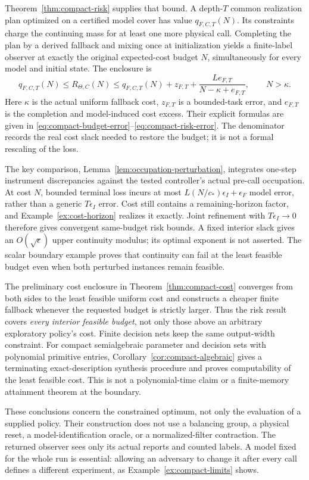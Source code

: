 Theorem~\ref{thm:compact-risk} supplies that bound. A depth-$T$ common realization plan optimized on a certified model cover has value $q_{F,C,T}(N)$. Its constraints charge the continuing mass for at least one more physical call. Completing the plan by a derived fallback and mixing once at initialization yields a finite-label observer at exactly the original expected-cost budget $N$, simultaneously for every model and initial state. The enclosure is
\[
 q_{F,C,T}(N)\le R_{\Theta,C}(N)
 \le q_{F,C,T}(N)+z_{F,T}
       +\frac{Le_{F,T}}{N-\kappa+e_{F,T}},
 \qquad N>\kappa.
\]
Here $\kappa$ is the actual uniform fallback cost, $z_{F,T}$ is a bounded-task error, and $e_{F,T}$ is the completion and model-induced cost excess. Their explicit formulas are given in \eqref{eq:compact-budget-error}--\eqref{eq:compact-risk-error}. The denominator records the real cost slack needed to restore the budget; it is not a formal rescaling of the loss.

The key comparison, Lemma~\ref{lem:occupation-perturbation}, integrates one-step instrument discrepancies against the tested controller's actual pre-call occupation. At cost $N$, bounded terminal loss incurs at most $L(N/c_*)\epsilon_I+\epsilon_F$ model error, rather than a generic $T\epsilon_I$ error. Cost still contains a remaining-horizon factor, and Example~\ref{ex:cost-horizon} realizes it exactly. Joint refinement with $T\epsilon_I\to0$ therefore gives convergent same-budget risk bounds. A fixed interior slack gives an $O(\sqrt\epsilon)$ upper continuity modulus; its optimal exponent is not asserted. The scalar boundary example proves that continuity can fail at the least feasible budget even when both perturbed instances remain feasible.

The preliminary cost enclosure in Theorem~\ref{thm:compact-cost} converges from both sides to the least feasible uniform cost and constructs a cheaper finite fallback whenever the requested budget is strictly larger. Thus the risk result covers \emph{every interior feasible budget}, not only those above an arbitrary exploratory policy's cost. Finite decision nets keep the same output-width constraint. For compact semialgebraic parameter and decision sets with polynomial primitive entries, Corollary~\ref{cor:compact-algebraic} gives a terminating exact-description synthesis procedure and proves computability of the least feasible cost. This is not a polynomial-time claim or a finite-memory attainment theorem at the boundary.

These conclusions concern the constrained optimum, not only the evaluation of a supplied policy. Their construction does not use a balancing group, a physical reset, a model-identification oracle, or a normalized-filter contraction. The returned observer sees only its actual reports and counted labels. A model fixed for the whole run is essential: allowing an adversary to change it after every call defines a different experiment, as Example~\ref{ex:compact-limits} shows.


